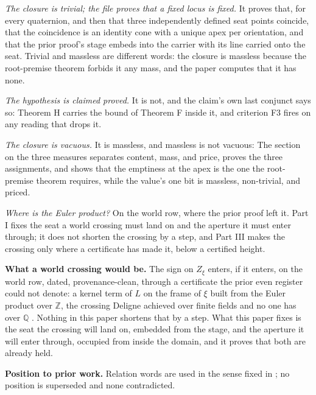 \documentclass[10pt,twocolumn]{article}
\begin{document}
\emph{The closure is trivial; the file proves that a fixed locus is
fixed.} It proves that, for every quaternion, and then that three
independently defined seat points coincide, that the coincidence is an
identity cone with a unique apex per orientation, and that the prior
proof's stage embeds into the carrier with its line carried onto the
seat. Trivial and massless are different words: the closure is massless
because the root-premise theorem forbids it any mass, and the paper
computes that it has none.

\emph{The hypothesis is claimed proved.} It is not, and the claim's own
last conjunct says so: Theorem H carries the bound of Theorem F inside
it, and criterion F3 fires on any reading that drops it.

\emph{The closure is vacuous.} It is massless, and massless is not
vacuous: The section on the three measures separates content, mass, and
price, proves the three assignments, and shows that the emptiness at the
apex is the one the root-premise theorem requires, while the value's one
bit is massless, non-trivial, and priced.

\emph{Where is the Euler product?} On the world row, where the prior
proof left it. Part I fixes the seat a world crossing must land on and
the aperture it must enter through; it does not shorten the crossing by
a step, and Part III makes the crossing only where a certificate has
made it, below a certified height.

\textbf{What a world crossing would be.} The sign on \(Z_\xi\) enters,
if it enters, on the world row, dated, provenance-clean, through a
certificate the prior even register could not denote: a kernel term of
\(L\) on the frame of \(\xi\) built from the Euler product over
\(\mathbb{Z}\), the crossing Deligne achieved over finite fields and no
one has over \(\mathbb{Q}\) \cite{deligne1974}. Nothing in this paper
shortens that by a step. What this paper fixes is the seat the crossing
will land on, embedded from the stage, and the aperture it will enter
through, occupied from inside the domain, and it proves that both are
already held.

\textbf{Position to prior work.} Relation words are used in the sense
fixed in \cite{islamcodex}; no position is superseded and none
contradicted.
\end{document}

